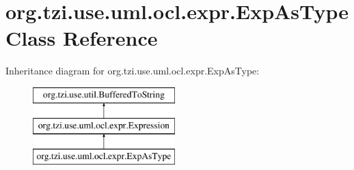 \hypertarget{classorg_1_1tzi_1_1use_1_1uml_1_1ocl_1_1expr_1_1_exp_as_type}{\section{org.\-tzi.\-use.\-uml.\-ocl.\-expr.\-Exp\-As\-Type Class Reference}
\label{classorg_1_1tzi_1_1use_1_1uml_1_1ocl_1_1expr_1_1_exp_as_type}
}
Inheritance diagram for org.\-tzi.\-use.\-uml.\-ocl.\-expr.\-Exp\-As\-Type\-:\begin{figure}[H]
\begin{center}
\leavevmode
\includegraphics[height=3.000000cm]{classorg_1_1tzi_1_1use_1_1uml_1_1ocl_1_1expr_1_1_exp_as_type}
\end{center}
\end{figure}
